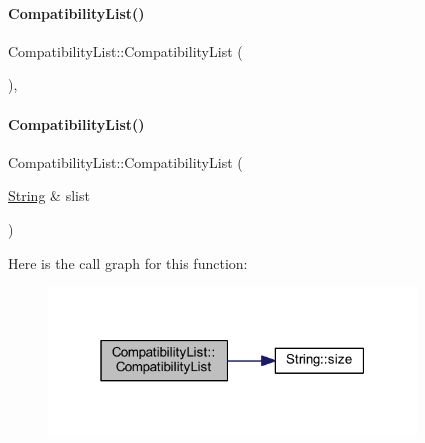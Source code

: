 \paragraph{\texorpdfstring{CompatibilityList()}{CompatibilityList()}\hspace{0.1cm}{\footnotesize\ttfamily [1/2]}}
{\footnotesize\ttfamily Compatibility\+List\+::\+Compatibility\+List (\begin{DoxyParamCaption}{ }\end{DoxyParamCaption})\hspace{0.3cm}{\ttfamily [inline]}, {\ttfamily [explicit]}}

\mbox{\label{class_compatibility_list_af34d724919febac11f933a4d42f3d550}} 
\paragraph{\texorpdfstring{CompatibilityList()}{CompatibilityList()}\hspace{0.1cm}{\footnotesize\ttfamily [2/2]}}
{\footnotesize\ttfamily Compatibility\+List\+::\+Compatibility\+List (\begin{DoxyParamCaption}\item[{\mbox{\hyperlink{class_string}{String}} \&}]{slist }\end{DoxyParamCaption})\hspace{0.3cm}{\ttfamily [explicit]}}

Here is the call graph for this function\+:
\nopagebreak
\begin{figure}[H]
\begin{center}
\leavevmode
\includegraphics[width=277pt]{class_compatibility_list_af34d724919febac11f933a4d42f3d550_cgraph}
\end{center}
\end{figure}
\mbox{\label{class_compatibility_list_ac3f2eebda805a5b587c498a4915161fc}} 

